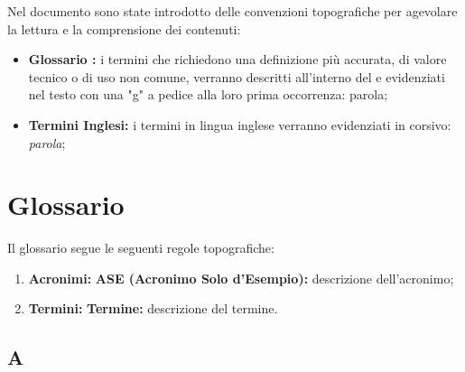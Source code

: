 \documentclass[11pt]{book}              %
\begin{document}
Nel documento sono state introdotto delle convenzioni topografiche per agevolare la lettura e la comprensione dei contenuti:

\begin{itemize}
	\item \textbf{Glossario :}  i termini che richiedono una definizione più accurata, di valore tecnico o di uso non comune, verranno descritti all'interno del  e evidenziati nel testo con una "g" a pedice alla loro prima occorrenza: parola;
	\item \textbf{Termini Inglesi:} i termini in lingua inglese verranno evidenziati in corsivo: \textit{parola};


\end{itemize}
\newpage
\thispagestyle{empty}

\tableofcontents    

\listoffigures

\listoftables

\newpage
\thispagestyle{empty}

\cfoot{}
\renewcommand{\footrulewidth}{0.2pt}
\newcommand{\numref}[1]{\textsl{\nameref{#1} (\ref{#1})}}                
\mainmatter       
  










\newpage

\chapter*{Glossario}
\label{Glossario}

Il glossario segue le seguenti regole topografiche:
\begin{enumerate}


	\item \textbf{Acronimi:} \textbf{{\color{OliveGreen}ASE }(Acronimo Solo d'Esempio):} descrizione dell'acronimo;
	\item \textbf{Termini:} \textbf{{\color{Plum}Termine}:} descrizione del termine.

\end{enumerate}

\section*{A}
\end{document}
